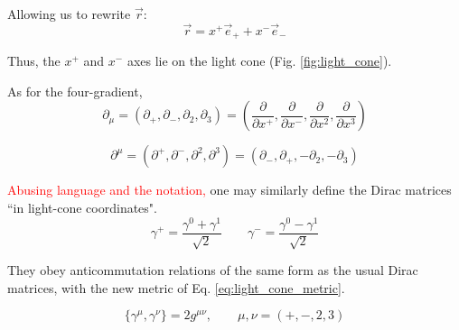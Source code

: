 Allowing us to rewrite $\vec{r}$:
\begin{equation}
	\vec{r} =  x^+ \vec{e}_+ + x^- \vec{e}_-
\end{equation}

Thus, the $x^+$ and $x^-$ axes lie on the light cone (Fig. \ref{fig:light_cone}).




As for the four-gradient,
\begin{equation}
	\partial_\mu = (\partial_+, \partial_-, \partial_2, \partial_3) = \left( \frac{\partial}{\partial x^+}, \frac{\partial}{\partial x^-}, \frac{\partial}{\partial x^2}, \frac{\partial}{\partial x^3} \right)
\end{equation}

\begin{equation}
	\partial^\mu = (\partial^+, \partial^-, \partial^2, \partial^3) = (\partial_-, \partial_+, -\partial_2, -\partial_3)
\end{equation}


\textcolor{red}{Abusing language and the notation,} one may similarly define the Dirac matrices ``in light-cone coordinates".
\begin{equation}
	\gamma^+ = \frac{\gamma^0 + \gamma^1}{\sqrt{2}} \qquad \gamma^- = \frac{\gamma^0 - \gamma^1}{\sqrt{2}} 
\end{equation}

They obey anticommutation relations of the same form as the usual Dirac matrices, with the new metric of Eq. \ref{eq:light_cone_metric}.

\begin{equation}
	\{ \gamma^\mu, \gamma^\nu \} = 2g^{\mu \nu}, \qquad \mu,\nu = (+,-,2,3)
\end{equation}





